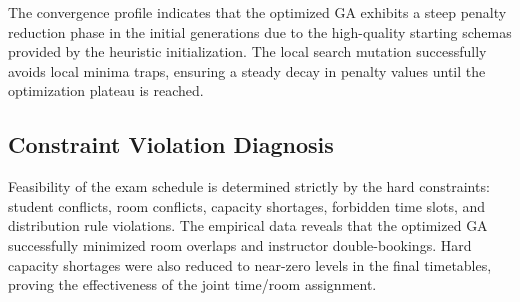 The convergence profile indicates that the optimized GA exhibits a steep penalty reduction phase in the initial generations due to the high-quality starting schemas provided by the heuristic initialization. The local search mutation successfully avoids local minima traps, ensuring a steady decay in penalty values until the optimization plateau is reached.

\subsection{Constraint Violation Diagnosis}
\label{subsec:constraint_violations_diagnosis}

Feasibility of the exam schedule is determined strictly by the hard constraints: student conflicts, room conflicts, capacity shortages, forbidden time slots, and distribution rule violations. The empirical data reveals that the optimized GA successfully minimized room overlaps and instructor double-bookings. Hard capacity shortages were also reduced to near-zero levels in the final timetables, proving the effectiveness of the joint time/room assignment.
